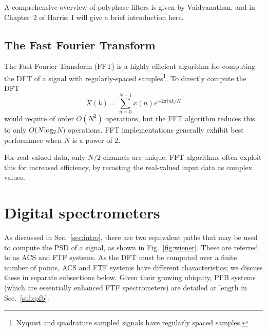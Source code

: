 \documentclass{ws-rv961x669}
\begin{document}


A comprehensive overview of polyphase filters is given by Vaidyanathan\citet{Vaidyanathan:1990p6127}, and in Chapter~2 of Harris\citet{BookHarrisMultirateDSP}; I will give a brief introduction here. 


\subsection{The Fast Fourier Transform\label{sub:fft}}

The Fast Fourier Transform\cite{Cooley1965, BookBrighamFFT, BookSmithFFT} (FFT) is a highly efficient algorithm for computing the DFT of a signal with regularly-spaced samples\footnote{Nyquist and quadrature sampled signals have regularly spaced samples.}. To directly compute the DFT
\begin{equation}
X(k)=\sum_{n=0}^{N-1}x(n)e^{-2\pi ink/N}\label{eq:dft1}
\end{equation}
would require of order $O(N^2)$ operations, but the FFT algorithm reduces this to only $O(N \rm{log_2}$$N)$ operations. FFT implementations generally exhibit best performance when $N$ is a power of 2. 

For real-valued data, only $N/2$ channels are unique. FFT algorithms often exploit this for increased efficiency, by recasting the real-valued input data as complex values.

\section{Digital spectrometers}
As discussed in Sec.~\ref{sec:intro}, there are two equivalent paths that may be used to compute the PSD of a signal, as shown in  Fig.~\ref{fig:wiener}. These are referred to as ACS and FTF systems. As the DFT must be computed over a finite number of points, ACS and FTF systems have different characteristics; we discuss these in separate subsections below. Given their growing ubiquity, PFB systems (which are essentially enhanced FTF spectrometers) are detailed at length in Sec.~\ref{sub:pfb}.
\end{document}
